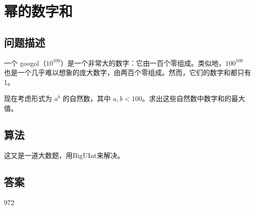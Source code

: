 \section{幂的数字和}\label{sec:problem56}
\subsection{问题描述}
\begin{tcolorbox}
一个 googol（$10^{100}$）是一个非常大的数字：它由一百个零组成。类似地，$100^{100}$ 也是一个几乎难以想象的庞大数字，由两百个零组成。然而，它们的数字和都只有 1。

现在考虑形式为 $a^b$ 的自然数，其中 $a, b < 100$。求出这些自然数中数字和的最大值。
\end{tcolorbox}

\subsection{算法}
这又是一道大数题，用BigUInt来解决。

\subsection{答案}
972
